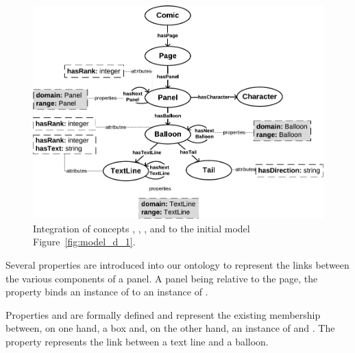 \begin{figure}[h!]
\begin{center}
\includegraphics[width=1\textwidth]{model_step2_new.pdf}
\caption[Complete comics model]{Integration of concepts , , ,  and  to the initial model Figure~\ref{fig:model_d_1}.}
\label{fig:model_d_2}
\end{center}
\end{figure}

Several properties are introduced into our ontology to represent the links between the various components of a panel.
A panel being relative to the page, the property  binds an instance of  to an instance of .

Properties  and  are formally defined and represent the existing membership between, on one hand, a box and, on the other hand, an instance of  and .
The property  represents the link between a text line and a balloon.

